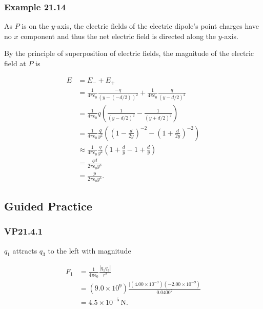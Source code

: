 \documentclass{article}
\begin{document}
\subsubsection{Example 21.14}

As $P$ is on the $y$-axis, the electric fields of the electric dipole's point charges have no $x$ component and thus the net electric field is directed along the $y$-axis.

By the principle of superposition of electric fields, the magnitude of the electric field at $P$ is

\begin{align*}
  E & = E_- + E_+                                                                                                                         \\
    & = \frac{1}{4\pi\epsilon_0} \frac{-q}{(y - (-d/2))^2} + \frac{1}{4\pi\epsilon_0} \frac{q}{(y - d/2)^2}                               \\
    & = \frac{1}{4\pi\epsilon_0}q\left(\frac{1}{(y-d/2)^2} - \frac{1}{(y + d/2)^2}\right)                                                 \\
    & = \frac{1}{4\pi\epsilon_0} \frac{q}{y^2} \left( \left( 1 - \frac{d}{2y} \right)^{-2} - \left( 1 + \frac{d}{2y} \right)^{-2} \right) \\
    & \approx \frac{1}{4\pi\epsilon_0} \frac{q}{y^2} \left( 1 + \frac{d}{y} - 1 + \frac{d}{y} \right)                                     \\
    & = \frac{qd}{2\pi\epsilon_0y^3}                                                                                                      \\
    & = \frac{p}{2\pi\epsilon_0y^3}.
\end{align*}

\subsection{Guided Practice}

\subsubsection{VP21.4.1}

$q_1$ attracts $q_3$ to the left with magnitude

\begin{align*}
  F_1 & = \frac{1}{4\pi\epsilon_0} \frac{|q_1q_3|}{r^2}                                   \\
      & = (9.0 \times 10^9) \frac{|(4.00 \times 10^{-9})(-2.00 \times 10^{-9})}{0.0400^2} \\
      & = 4.5 \times 10^{-5} \,\textrm{N}.
\end{align*}
\end{document}
